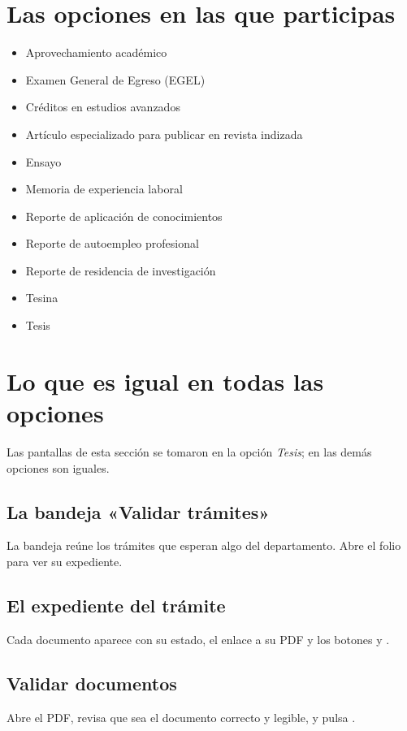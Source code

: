 \section{Las opciones en las que participas}
\begin{itemize}
  \item Aprovechamiento académico
  \item Examen General de Egreso (EGEL)
  \item Créditos en estudios avanzados
  \item Artículo especializado para publicar en revista indizada
  \item Ensayo
  \item Memoria de experiencia laboral
  \item Reporte de aplicación de conocimientos
  \item Reporte de autoempleo profesional
  \item Reporte de residencia de investigación
  \item Tesina
  \item Tesis
\end{itemize}
\section{Lo que es igual en todas las opciones}
Las pantallas de esta sección se tomaron en la opción \emph{Tesis}; en las demás opciones son iguales.
\subsection{La bandeja «Validar trámites»}
La bandeja reúne los trámites que esperan algo del departamento. Abre el folio para ver su expediente.
\subsection{El expediente del trámite}
Cada documento aparece con su estado, el enlace a su PDF y los botones  y .
\subsection{Validar documentos}
Abre el PDF, revisa que sea el documento correcto y legible, y pulsa .
